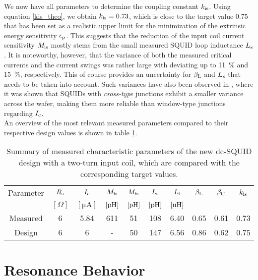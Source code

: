 We now have all parameters to determine the coupling constant $k_{\rm is}$. Using equation \ref{kis_theo}, we obtain $k_{\rm is}=0.73$, which is close to the target value 0.75 that has been set as a realistic upper limit for the minimization of the extrinsic energy sensitivity $\epsilon_{\rm p}$. This suggests that the reduction of the input coil current sensitivity $M_{\rm is}$ mostly stems from the small measured SQUID loop inductance $L_{\rm s}$. It is noteworthy, however, that the variance of both the measured critical currents and the current swings was rather large with deviating up to \qty{11}{\percent} and \qty{15}{\percent}, respectively. This of course provides an uncertainty for $\beta_{\rm L}$ and $L_{\rm s}$ that needs to be taken into account. Such variances have also been observed in \cite{Bauer2022}, where it was shown that SQUIDs with \textit{cross-type} junctions exhibit a smaller variance across the wafer, making them more reliable than window-type junctions regarding $I_{\rm c}$. \\    
An overview of the most relevant measured parameters compared to their respective design values is shown in table \ref{tab:SQUIDparameters}.

\begin{table}[htb]
	\centering
	\begin{tabular}{c|*{9}{c}}
	\toprule
		Parameter & $R_{\rm s}$ & $I_{\rm c}$ & $M_{\rm is}$ & $M_{\rm fs}$ & $L_{\rm s}$ & $L_{\rm i}$ & $\beta_{\rm L}$ & $\beta_{\rm C}$ & $k_{\rm is}$ \\
		 & $[\Omega]$ & $[\unit{\micro\ampere}]$ & $[\unit{\pH}]$ & $[\unit{\pH}]$ & $[\unit{\pH}]$ & $[\unit{\nH}]$ &  &  &  \\
		\midrule
		Measured & 6 & 5.84 & 611 & 51 & 108 & 6.40 & 0.65 & 0.61 & 0.73 \\
		Design & 6 & 6 & - & 50 & 147 & 6.56 & 0.86 & 0.62 & 0.75 \\
	\end{tabular}
	\caption{Summary of measured characteristic parameters of the new dc-SQUID design with a two-turn input coil, which are compared with the corresponding target values.}
	\label{tab:SQUIDparameters}
\end{table}

\section{Resonance Behavior}\label{sec_resonance_results}

